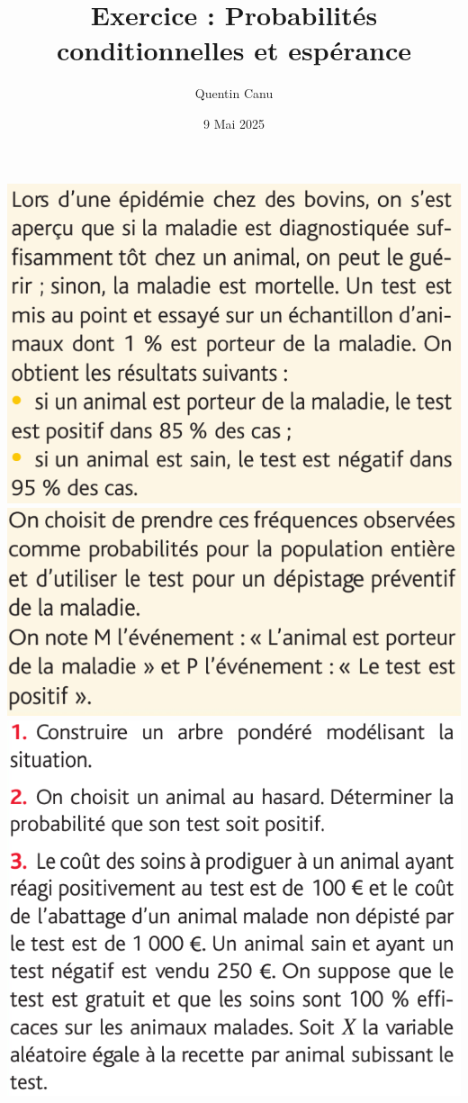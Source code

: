 \documentclass{article}
\title{Exercice : Probabilités conditionnelles et espérance}
\date{9 Mai 2025}
\author{Quentin Canu}
\begin{document}
\maketitle
\begin{center}
\includegraphics[width=\textwidth]{Exercice_Avance.png}
\includegraphics[width=\textwidth]{Exercice_Avance_2.png}
\includegraphics[width=\textwidth]{Exercice_Avance_3.png}

\end{center}
\end{document}
